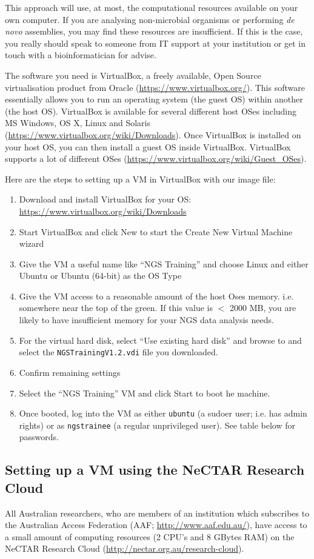 This approach will use, at most, the computational resources available on
your own computer. If you are analysing non-microbial organisms or performing
\textit{de novo} assemblies, you may find these resources are insufficient. If this is the
case, you really should speak to someone from IT support at your institution or
get in touch with a bioinformatician for advise.

The software you need is VirtualBox, a freely available, Open Source
virtualisation product from Oracle (\url{https://www.virtualbox.org/}). This
software essentially allows you to run an operating system (the guest OS) within
another (the host OS). VirtualBox is available for several different host OSes
including MS Windows, OS X, Linux and Solaris
(\url{https://www.virtualbox.org/wiki/Downloads}). Once VirtualBox is installed
on your host OS, you can then install a guest OS inside VirtualBox. VirtualBox
supports a lot of different OSes
(\url{https://www.virtualbox.org/wiki/Guest_OSes}).

Here are the steps to setting up a VM in VirtualBox with our image file:
\begin{enumerate}
  \item Download and install VirtualBox for your OS: 
  \url{https://www.virtualbox.org/wiki/Downloads}
  \item Start VirtualBox and click New to start the Create New Virtual Machine wizard
  \item Give the VM a useful name like ``NGS Training'' and choose Linux and
  either Ubuntu or Ubuntu (64-bit) as the OS Type
  \item Give the VM access to a reasonable amount of the host Oses memory. i.e.
  somewhere near the top of the green. If this value is $<$ 2000 MB, you are
  likely to have insufficient memory for your NGS data analysis needs.
  \item For the virtual hard disk, select ``Use existing hard disk'' and browse
  to and select the \texttt{NGSTrainingV1.2.vdi} file you downloaded.
  \item Confirm remaining settings
  \item Select the ``NGS Training'' VM and click Start to boot he machine.
  \item Once booted, log into the VM as either \texttt{ubuntu} (a sudoer user;
  i.e. has admin rights) or as \texttt{ngstrainee} (a regular unprivileged
  user). See table below for passwords.
\end{enumerate}


\subsection{Setting up a VM using the NeCTAR Research Cloud}
All Australian researchers, who are members of an institution which subscribes
to the Australian Access Federation (AAF; \url{http://www.aaf.edu.au/}), have
access to a small amount of computing resources (2 CPU's and 8 GBytes RAM) on
the NeCTAR Research Cloud (\url{http://nectar.org.au/research-cloud}).


